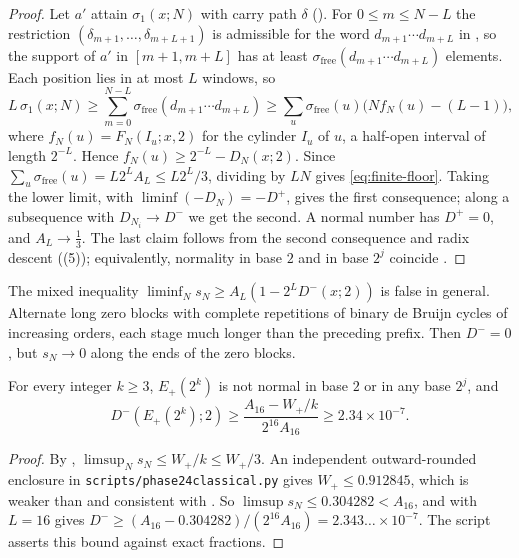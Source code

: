 \documentclass[11pt]{article}
\newcommand{\ttbreak}{\discretionary{}{}{}}
\newcommand{\ttt}[1]{\texttt{\begingroup\def\_{\textunderscore\ttbreak}#1\endgroup}}
\newcommand{\sfree}{\sigma_{\mathrm{free}}}
\begin{document}
\begin{proof}
Let $a'$ attain $\sigma_1(x;N)$ with carry path $\delta$ (). For $0\le m\le N-L$ the restriction $(\delta_{m+1},\dots,\delta_{m+L+1})$ is admissible for the word $d_{m+1}\cdots d_{m+L}$ in , so the support of $a'$ in $[m+1,m+L]$ has at least $\sfree(d_{m+1}\cdots d_{m+L})$ elements. Each position lies in at most $L$ windows, so
\[
L\,\sigma_1(x;N)\ge\sum_{m=0}^{N-L}\sfree(d_{m+1}\cdots d_{m+L})\ge\sum_u\sfree(u)\bigl(Nf_N(u)-(L-1)\bigr),
\]
where $f_N(u)=F_N(I_u;x,2)$ for the cylinder $I_u$ of $u$, a half-open interval of length $2^{-L}$. Hence $f_N(u)\ge2^{-L}-D_N(x;2)$. Since $\sum_u\sfree(u)=L2^LA_L\le L2^L/3$, dividing by $LN$ gives \eqref{eq:finite-floor}. Taking the lower limit, with $\liminf(-D_N)=-D^+$, gives the first consequence; along a subsequence with $D_{N_i}\to D^-$ we get the second. A normal number has $D^+=0$, and $A_L\to\frac13$. The last claim follows from the second consequence and radix descent ((5)); equivalently, normality in base $2$ and in base $2^j$ coincide \cite{Maxfield53}.
\end{proof}

\begin{remark}\label{rem:mixed}
The mixed inequality $\liminf_Ns_N\ge A_L(1-2^LD^-(x;2))$ is false in general. Alternate long zero blocks with complete repetitions of binary de Bruijn cycles of increasing orders, each stage much longer than the preceding prefix. Then $D^-=0$, but $s_N\to0$ along the ends of the zero blocks.
\end{remark}

\begin{theorem}\label{thm:Eplus-k3}
For every integer $k\ge3$, $E_+(2^k)$ is not normal in base $2$ or in any base $2^j$, and
\[
D^-(E_+(2^k);2)\ge\frac{A_{16}-W_+/k}{2^{16}A_{16}}\ge2.34\times10^{-7}.
\]
\end{theorem}

\begin{proof}
By , $\limsup_Ns_N\le W_+/k\le W_+/3$. An independent outward-rounded enclosure in \ttt{scripts/phase24\_classical.py} gives $W_+\le0.912845$, which is weaker than and consistent with . So $\limsup s_N\le0.304282<A_{16}$, and  with $L=16$ gives $D^-\ge(A_{16}-0.304282)/(2^{16}A_{16})=2.343\ldots\times10^{-7}$. The script asserts this bound against exact fractions.
\end{proof}
\end{document}
